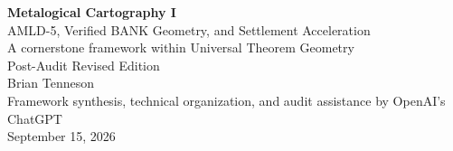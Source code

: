 \documentclass[11pt]{article}
\begin{document}
\begin{center}
{\LARGE\bfseries Metalogical Cartography I}\\[0.35em]
{\Large AMLD-5, Verified BANK Geometry, and Settlement Acceleration}\\[0.45em]
{\large A cornerstone framework within Universal Theorem Geometry}\\[0.30em]
{\normalsize Post-Audit Revised Edition}\\[0.85em]
{\large Brian Tenneson}\\[0.25em]
{\normalsize Framework synthesis, technical organization, and audit assistance by OpenAI's ChatGPT}\\[0.25em]
{\normalsize September 15, 2026}\\[0.75em]
\end{center}
\end{document}

